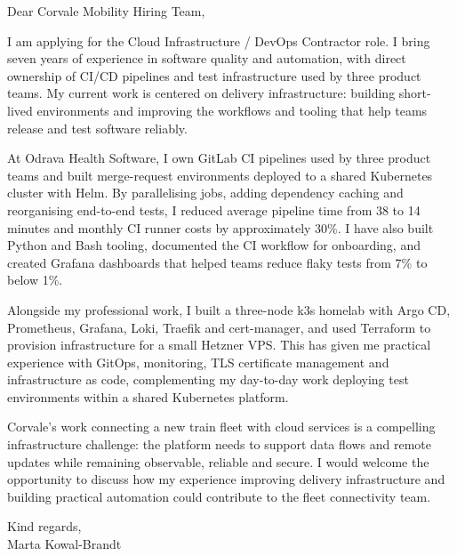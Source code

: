 \documentclass[11pt,a4paper]{article}
\begin{document}
Dear Corvale Mobility Hiring Team,

I am applying for the Cloud Infrastructure / DevOps Contractor role. I bring seven years of experience in software quality and automation, with direct ownership of CI/CD pipelines and test infrastructure used by three product teams. My current work is centered on delivery infrastructure: building short-lived environments and improving the workflows and tooling that help teams release and test software reliably.

At Odrava Health Software, I own GitLab CI pipelines used by three product teams and built merge-request environments deployed to a shared Kubernetes cluster with Helm. By parallelising jobs, adding dependency caching and reorganising end-to-end tests, I reduced average pipeline time from 38 to 14 minutes and monthly CI runner costs by approximately 30\%. I have also built Python and Bash tooling, documented the CI workflow for onboarding, and created Grafana dashboards that helped teams reduce flaky tests from 7\% to below 1\%.

Alongside my professional work, I built a three-node k3s homelab with Argo CD, Prometheus, Grafana, Loki, Traefik and cert-manager, and used Terraform to provision infrastructure for a small Hetzner VPS. This has given me practical experience with GitOps, monitoring, TLS certificate management and infrastructure as code, complementing my day-to-day work deploying test environments within a shared Kubernetes platform.

Corvale's work connecting a new train fleet with cloud services is a compelling infrastructure challenge: the platform needs to support data flows and remote updates while remaining observable, reliable and secure. I would welcome the opportunity to discuss how my experience improving delivery infrastructure and building practical automation could contribute to the fleet connectivity team.

Kind regards,\\
Marta Kowal-Brandt
\end{document}
